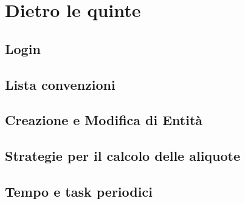 \documentclass[a4paper,10pt]{report}
\begin{document}
\chapter{Dietro le quinte}
\label{code}
\section{Login}

\section{Lista convenzioni}


\section{Creazione e Modifica di Entità}


\section{Strategie per il calcolo delle aliquote}

\section{Tempo e task periodici}

\end{document}
